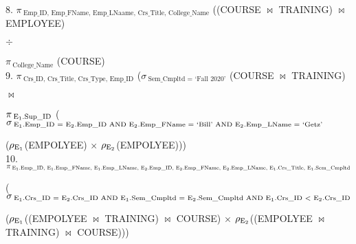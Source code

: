 \documentclass[letterpaper,12pt]{article}
\begin{document}
8. $\pi\,_{\text{Emp\_ID, Emp\_FName, Emp\_LNaame, Crs\_Title, College\_Name}}$ ((COURSE $\bowtie$ TRAINING) $\bowtie$ EMPLOYEE)


$\div$


$\pi\,_{\text{College\_Name}}$ (COURSE) \\

9. $\pi\,_{\text{Crs\_ID, Crs\_Title, Crs\_Type, Emp\_ID}}$ ($\sigma\,_{\text{Sem\_Cmpltd\ $=$ `Fall 2020'}}$ (COURSE $\bowtie$ TRAINING) 


$\bowtie$ 


$\pi\,_{\text{$\rm E_{1}$.Sup\_ID}}$ ($\sigma\,_{\text{$\rm E_{1}$.Emp\_ID $=$ $\rm E_{2}$.Emp\_ID AND $\rm E_{2}$.Emp\_FName $=$ `Bill' AND $\rm E_{2}$.Emp\_LName $=$ `Getz'}}$


($\rho_{\rm E_{1}}$(EMPOLYEE) $\times$ $\rho_{\rm E_{2}}$(EMPOLYEE))) \\

10. $\pi\,_{\text{$\rm E_{1}$.Emp\_ID, $\rm E_{1}$.Emp\_FName, $\rm E_{1}$.Emp\_LName, $\rm E_{2}$.Emp\_ID, $\rm E_{2}$.Emp\_FName, $\rm E_{2}$.Emp\_LName, $\rm E_{1}$.Crs\_Title, $\rm E_{1}$.Sem\_Cmpltd}}$


($\sigma\,_{\text{$\rm E_{1}$.Crs\_ID $=$ $\rm E_{2}$.Crs\_ID AND $\rm E_{1}$.Sem\_Cmpltd $=$ $\rm E_{2}$.Sem\_Cmpltd AND $\rm E_{1}$.Crs\_ID $<$ $\rm E_{2}$.Crs\_ID}}$


($\rho_{\rm E_{1}}$((EMPOLYEE $\bowtie$ TRAINING) $\bowtie$ COURSE) $\times$ $\rho_{\rm E_{2}}$((EMPOLYEE $\bowtie$ TRAINING) $\bowtie$ COURSE)))
\end{document}
